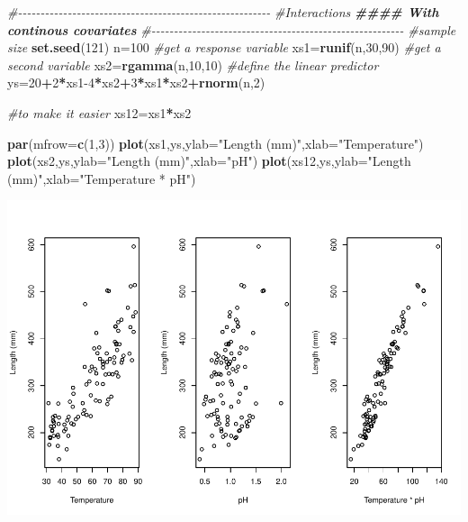 \documentclass[
]{book}
\newenvironment{Shaded}{\begin{snugshade}}{\end{snugshade}}
\newcommand{\AttributeTok}[1]{\textcolor[rgb]{0.13,0.29,0.53}{#1}}
\newcommand{\CommentTok}[1]{\textcolor[rgb]{0.56,0.35,0.01}{\textit{#1}}}
\newcommand{\DecValTok}[1]{\textcolor[rgb]{0.00,0.00,0.81}{#1}}
\newcommand{\DocumentationTok}[1]{\textcolor[rgb]{0.56,0.35,0.01}{\textbf{\textit{#1}}}}
\newcommand{\FunctionTok}[1]{\textcolor[rgb]{0.13,0.29,0.53}{\textbf{#1}}}
\newcommand{\NormalTok}[1]{#1}
\newcommand{\OtherTok}[1]{\textcolor[rgb]{0.56,0.35,0.01}{#1}}
\newcommand{\SpecialCharTok}[1]{\textcolor[rgb]{0.81,0.36,0.00}{\textbf{#1}}}
\newcommand{\StringTok}[1]{\textcolor[rgb]{0.31,0.60,0.02}{#1}}
\begin{document}
\begin{Shaded}
\begin{Highlighting}[]
\CommentTok{\#{-}{-}{-}{-}{-}{-}{-}{-}{-}{-}{-}{-}{-}{-}{-}{-}{-}{-}{-}{-}{-}{-}{-}{-}{-}{-}{-}{-}{-}{-}{-}{-}{-}{-}{-}{-}{-}{-}{-}{-}{-}{-}{-}{-}{-}{-}{-}{-}{-}{-}{-}{-}{-}{-}{-}{-}}
\CommentTok{\#Interactions}
\DocumentationTok{\#\#\#\# With continous covariates}
\CommentTok{\#{-}{-}{-}{-}{-}{-}{-}{-}{-}{-}{-}{-}{-}{-}{-}{-}{-}{-}{-}{-}{-}{-}{-}{-}{-}{-}{-}{-}{-}{-}{-}{-}{-}{-}{-}{-}{-}{-}{-}{-}{-}{-}{-}{-}{-}{-}{-}{-}{-}{-}{-}{-}{-}{-}{-}{-}}
\CommentTok{\#sample size}
\FunctionTok{set.seed}\NormalTok{(}\DecValTok{121}\NormalTok{)}
\NormalTok{n}\OtherTok{=}\DecValTok{100}
\CommentTok{\#get a response variable}
\NormalTok{xs1}\OtherTok{=}\FunctionTok{runif}\NormalTok{(n,}\DecValTok{30}\NormalTok{,}\DecValTok{90}\NormalTok{)}
\CommentTok{\#get a second variable}
\NormalTok{xs2}\OtherTok{=}\FunctionTok{rgamma}\NormalTok{(n,}\DecValTok{10}\NormalTok{,}\DecValTok{10}\NormalTok{)}
\CommentTok{\#define the linear predictor}
\NormalTok{ys}\OtherTok{=}\DecValTok{20}\SpecialCharTok{+}\DecValTok{2}\SpecialCharTok{*}\NormalTok{xs1}\DecValTok{{-}4}\SpecialCharTok{*}\NormalTok{xs2}\SpecialCharTok{+}\DecValTok{3}\SpecialCharTok{*}\NormalTok{xs1}\SpecialCharTok{*}\NormalTok{xs2}\SpecialCharTok{+}\FunctionTok{rnorm}\NormalTok{(n,}\DecValTok{2}\NormalTok{)}

\CommentTok{\#to make it easier}
\NormalTok{xs12}\OtherTok{=}\NormalTok{xs1}\SpecialCharTok{*}\NormalTok{xs2}

\FunctionTok{par}\NormalTok{(}\AttributeTok{mfrow=}\FunctionTok{c}\NormalTok{(}\DecValTok{1}\NormalTok{,}\DecValTok{3}\NormalTok{))}
\FunctionTok{plot}\NormalTok{(xs1,ys,}\AttributeTok{ylab=}\StringTok{"Length (mm)"}\NormalTok{,}\AttributeTok{xlab=}\StringTok{"Temperature"}\NormalTok{)}
\FunctionTok{plot}\NormalTok{(xs2,ys,}\AttributeTok{ylab=}\StringTok{"Length (mm)"}\NormalTok{,}\AttributeTok{xlab=}\StringTok{"pH"}\NormalTok{)}
\FunctionTok{plot}\NormalTok{(xs12,ys,}\AttributeTok{ylab=}\StringTok{"Length (mm)"}\NormalTok{,}\AttributeTok{xlab=}\StringTok{"Temperature * pH"}\NormalTok{)}
\end{Highlighting}
\end{Shaded}

\includegraphics{ECOMODbook_files/figure-latex/a12.1-1.pdf}
\end{document}
